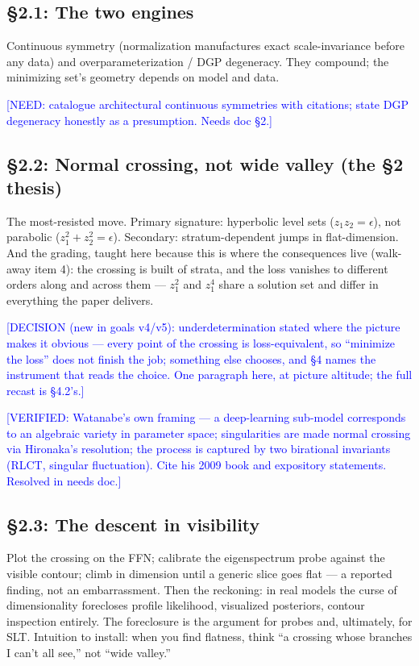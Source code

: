 \documentclass[11pt]{article}
\newcommand{\tagg}[1]{\textcolor{blue}{[#1]}}
\begin{document}
\subsection*{\S2.1: The two engines}

Continuous symmetry (normalization manufactures exact scale-invariance
before any data) and overparameterization / DGP degeneracy. They
compound; the minimizing set's geometry depends on model and data.

\tagg{NEED: catalogue architectural continuous symmetries with
citations; state DGP degeneracy honestly as a presumption. Needs doc
\S2.}

\subsection*{\S2.2: Normal crossing, not wide valley (the \S2 thesis)}

The most-resisted move. Primary signature: hyperbolic level sets
($z_1z_2=\epsilon$), not parabolic ($z_1^2+z_2^2=\epsilon$). Secondary:
stratum-dependent jumps in flat-dimension. And the grading, taught here
because this is where the consequences live (walk-away item 4): the
crossing is built of strata, and the loss vanishes to different orders
along and across them --- $z_1^2$ and $z_1^4$ share a solution set and
differ in everything the paper delivers.

\tagg{DECISION (new in goals v4/v5): underdetermination stated where the
picture makes it obvious --- every point of the crossing is
loss-equivalent, so ``minimize the loss'' does not finish the job;
something else chooses, and \S4 names the instrument that reads the
choice. One paragraph here, at picture altitude; the full recast is
\S4.2's.}

\tagg{VERIFIED: Watanabe's own framing --- a deep-learning sub-model
corresponds to an algebraic variety in parameter space; singularities
are made normal crossing via Hironaka's resolution; the process is
captured by two birational invariants (RLCT, singular fluctuation).
Cite his 2009 book and expository statements. Resolved in needs doc.}

\subsection*{\S2.3: The descent in visibility}

Plot the crossing on the FFN; calibrate the eigenspectrum probe against
the visible contour; climb in dimension until a generic slice goes flat
--- a reported finding, not an embarrassment. Then the reckoning: in
real models the curse of dimensionality forecloses profile likelihood,
visualized posteriors, contour inspection entirely. The foreclosure is
the argument for probes and, ultimately, for SLT. Intuition to install:
when you find flatness, think ``a crossing whose branches I can't all
see,'' not ``wide valley.''
\end{document}
